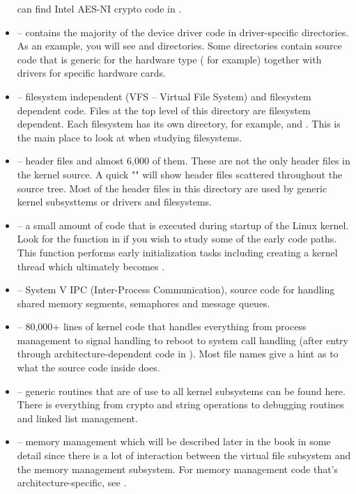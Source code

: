 \begin{itemize}
		can find Intel AES-NI crypto code in .
	\item {} -- contains the majority of the device driver code in driver-specific directories. As an example, you
		will see  and  directories. Some directories contain source code that is generic
		for the hardware type ( for example) together with drivers for specific hardware cards.
	\item {} -- filesystem independent (VFS -- Virtual File System) and filesystem dependent code. Files 
		at the top level of this directory are filesystem dependent. Each filesystem has its own directory, for 
		example,  and . This is the main place to look at when studying filesystems.
	\item {} -- header files and almost 6,000 of them. These are not the only header files
		in the kernel source. A quick "" will show header files scattered
		throughout the source tree. Most of the header files in this directory are used by generic
		kernel subsysttems or drivers and filesystems.
	\item {} -- a small amount of code that is executed during startup of the Linux kernel. Look for the
		function  in  if you wish to study some of the early code paths. This function 
		performs early initialization tasks including creating a kernel thread which ultimately becomes .
	\item {} -- System V IPC (Inter-Process Communication), source code for handling shared memory segments, 
		semaphores and message queues. 
	\item {} -- 80,000+ lines of kernel code that handles everything from process management to signal 
		handling to reboot to system call handling (after entry through architecture-dependent code 
		in ). Most file names give a hint as to what the source code inside does.
	\item {} -- generic routines that are of use to all kernel subsystems can be found here. There is
		everything from crypto and string operations to debugging routines and linked list management.
	\item {} -- memory management which will be described later in the book in some detail since there is a lot 
		of interaction between the virtual file subsystem and the memory management subsystem. For memory management
		code that's architecture-specific, see .

\end{itemize}
